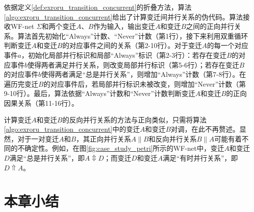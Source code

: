 依据定义\ref{def:exroru_transition_concurrent}的折叠方法，算法\ref{algo:exroru_transition_concurrent}给出了计算变迁间并行关系的伪代码。算法接收WF-net $\Sigma$和两个变迁$A$、$B$作为输入，输出变迁$A$和变迁$B$之间的正向并行关系。算法首先初始化“Always”计数、“Never”计数（第1行），接下来利用双重循环判断变迁$A$和变迁$B$的对应事件之间的关系（第2-10行）。对于变迁$A$的每一个对应事件$a$，初始化局部并行标识和局部“Always”标识（第2-3行）：若存在变迁$B$的对应事件$b$使得两者满足并行关系，则改变局部并行标识（第5-6行）；若存在变迁$B$的对应事件$b$使得两者满足“总是并行关系”，则增加“Always”计数（第7-8行）。在遍历完变迁$B$的对应事件后，若局部并行标识未被改变，则增加“Never”计数（第9-10行）。最后，算法依据“Always”计数和“Never”计数判断变迁$A$和变迁$B$的正向因果关系（第11-16行）。

计算变迁$A$和变迁$B$的反向并行关系的方法与正向类似，只需将算法\ref{algo:exroru_transition_concurrent}中的变迁$A$和变迁$B$对调，在此不再赘述。显然，对于一对变迁$A$和$B$，其正向并行关系$A\parallel B$和反向并行关系$B\parallel A$可能有着不同的不确定性。例如，在图\ref{fig:case_study_petri}所示的WF-net中，变迁$A$和变迁$D$满足“总是并行关系”，即$A\Updownarrow D$；而变迁$D$和变迁$A$满足“有时并行关系”，即$D\Uparrow A$。

\section{本章小结}